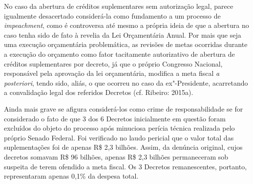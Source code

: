 No caso da abertura de créditos suplementares sem autorização legal,
parece igualmente desacertado considerá-la como fundamento a um processo
de \emph{impeachment}, como é controversa até mesmo a própria ideia de
que a abertura no caso tenha sido de fato à revelia da Lei Orçamentária
Anual. Por mais que seja uma execução orçamentária problemática, as
revisões de metas ocorridas durante a execução do orçamento como fator
tacitamente autorizativo de abertura de créditos suplementares por
decreto, já que o próprio Congresso Nacional, responsável pela aprovação
da lei orçamentária, modifica a meta fiscal \emph{a posteriori}, tendo
sido, aliás, o que ocorreu no caso da ex"-Presidente, acarretando a
convalidação legal dos referidos Decretos (cf. Ribeiro: 2015a).

Ainda mais grave se afigura considerá-los como crime de responsabilidade
se for considerado o fato de que 3 dos 6 Decretos inicialmente em
questão foram excluídos do objeto do processo após minuciosa perícia
técnica realizada pelo próprio Senado Federal. Foi verificado no laudo
pericial que o valor total das suplementações foi de apenas R\$ 2,3
bilhões. Assim, da denúncia original, cujos decretos somavam R\$ 96
bilhões, apenas R\$ 2,3 bilhões permaneceram sob suspeita de terem
ofendido a meta fiscal. Os 3 Decretos remanescentes, portanto,
representaram apenas 0,1\% da despesa total.

